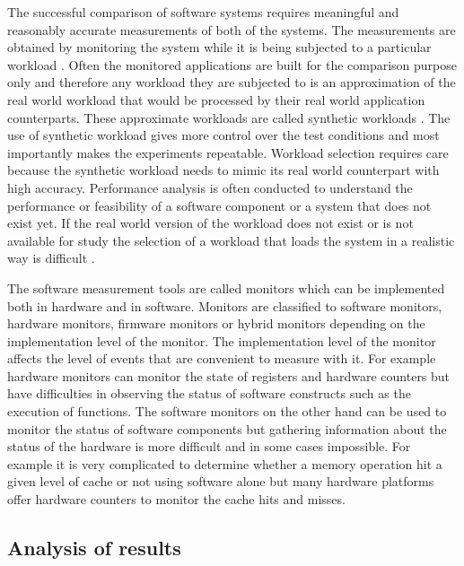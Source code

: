 The successful comparison of software systems requires meaningful and reasonably
accurate measurements of both of the systems. The measurements are obtained by
monitoring the system while it is being subjected to a particular workload
\cite{jain1991art}. Often the monitored applications are built for the
comparison purpose only and therefore any workload they are subjected to is an
approximation of the real world workload that would be processed by their real
world application counterparts. These approximate workloads are called synthetic
workloads \cite{jain1991art}. The use of synthetic workload gives more control
over the test conditions and most importantly makes the experiments repeatable.
Workload selection requires care because the synthetic workload needs to mimic
its real world counterpart with high accuracy. Performance analysis is often
conducted to understand the performance or feasibility of a software component
or a system that does not exist yet. If the real world version of the workload
does not exist or is not available for study the selection of a workload that
loads the system in a realistic way is difficult \cite{jain1991art}.

The software measurement tools are called monitors which can be implemented both
in hardware and in software. Monitors are classified to software monitors,
hardware monitors, firmware monitors or hybrid monitors depending on the
implementation level of the monitor. The implementation level of the monitor
affects the level of events that are convenient to measure with it. For example
hardware monitors can monitor the state of registers and hardware counters but
have difficulties in observing the status of software constructs such as the
execution of functions. The software monitors on the other hand can be used to
monitor the status of software components but gathering information about the
status of the hardware is more difficult and in some cases impossible.
\cite{jain1991art} For example it is very complicated to determine whether a
memory operation hit a given level of cache or not using software alone but many
hardware platforms offer hardware counters to monitor the cache hits and misses.

\subsection{Analysis of results}


